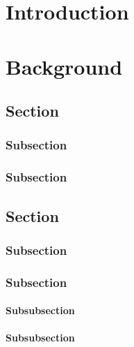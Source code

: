 




\chapter{Introduction}

\lipsum

\chapter{Background}
\lipsum[1]

    \section{Section}
    \lipsum[2]
    
        \subsection{Subsection}
        \lipsum[3]
        
        \subsection{Subsection}
        \lipsum[4]

    \section{Section}
    \lipsum[5]
    
        \subsection{Subsection}
        \lipsum[6]

        \subsection{Subsection}
        \lipsum[7]
        
            \subsubsection{Subsubsection}
            \lipsum[8]  
            
            \subsubsection{Subsubsection}
            \lipsum[9]
            
